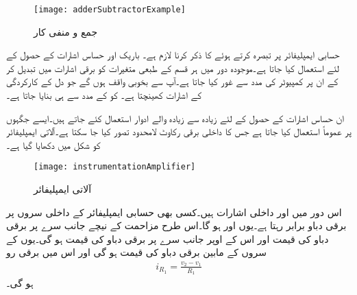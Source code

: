 %
\begin{figure}
\centering
\texttt{[image: adderSubtractorExample]}
\caption{جمع و منفی کار}
\label{شکل_جمع_و_منفی_کار}
\end{figure}


حسابی ایمپلیفائر پر تبصرہ کرتے ہوئے  کا ذکر کرنا لازم ہے۔ باریک اور حساس اشارات کے حصول کے لئے استعمال کیا جاتا ہے۔موجودہ دور میں ہر قسم کے طبعی متغیرات کو برقی اشارات میں تبدیل کر کے ان پر کمپیوٹر کی مدد سے غور کیا جاتا ہے۔آپ  سے بخوبی واقف ہوں گے جو دل کے کارکردگی کے اشارات کھینچتا ہے۔ کو  کے مدد سے ہی بنایا جاتا ہے۔

ان حساس اشارات کے حصول کے لئے زیادہ سے زیادہ   والے ادوار استعمال کئے جاتے ہیں۔ایسے جگہوں پر عموماً  استعمال کیا جاتا ہے جس کا داخلی برقی رکاوٹ لامحدود تصور کیا جا سکتا ہے۔آلاتی ایمپلیفائر  کو شکل  میں دکھایا گیا ہے۔

\begin{figure}
\centering
\texttt{[image: instrumentationAmplifier]}
\caption{آلاتی ایمپلیفائر}
\label{شکل_آلاتی_ایمپلیفائر}
\end{figure}
اس دور میں   اور  داخلی اشارات ہیں۔کسی بھی حسابی ایمپلیفائر کے داخلی سروں پر برقی دباو برابر رہتا ہے۔یوں  اور   ہو گا۔اس طرح مزاحمت  کے نیچے جانب سرے پر برقی دباو کی قیمت  اور اس کے اوپر جانب سرے پر برقی دباو کی قیمت  ہو گی۔یوں  کے سروں کے مابین برقی دباو کی قیمت  ہو گی اور اس میں برقی رو
\begin{align}
i_{R_1}=\frac{v_2-v_1}{R_1}
\end{align}
ہو گی۔

